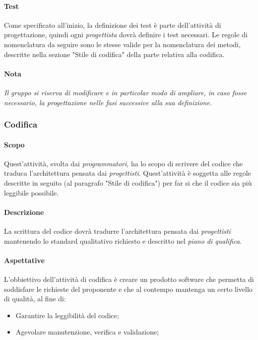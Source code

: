\documentclass[../norme_di_progetto.tex]{subfiles}
\begin{document}
    \paragraph{Test}
    Come specificato all'inizio, la definizione dei test è parte dell'attività di progettazione, quindi ogni \emph{progettista} dovrà definire i test necessari. Le regole di nomenclatura da seguire sono le stesse valide per la nomenclatura dei metodi, descritte nella sezione "Stile di codifica" della parte relativa alla codifica.

    \paragraph{Nota}
    \emph{Il gruppo si riserva di modificare e in particolar modo di ampliare, in caso fosse necessario, la progettazione nelle fasi successive alla sua definizione.}

\subsubsection{Codifica}
 
    \paragraph{Scopo}
    Quest'attività, svolta dai \emph{programmatori}, ha lo scopo di scrivere del codice che traduca l'architettura pensata dai \emph{progettisti}. Quest'attività è soggetta alle regole descritte in seguito (al paragrafo "Stile di codifica") per far si che il codice sia più leggibile possibile.

    \paragraph{Descrizione}
    La scrittura del codice dovrà tradurre l'architettura pensata dai \emph{progettisti} mantenendo lo standard qualitativo richiesto e descritto nel \emph{piano di qualifica}.

    \paragraph{Aspettative}
    L'obbiettivo dell'attività di codifica è creare un prodotto software che permetta di soddisfare le richieste del proponente e che al contempo mantenga un certo livello di qualità, al fine di:
    \begin{itemize}
        \item Garantire la leggibilità del codice;
        \item Agevolare manutenzione, verifica e validazione;
    \end{itemize}
\end{document}
